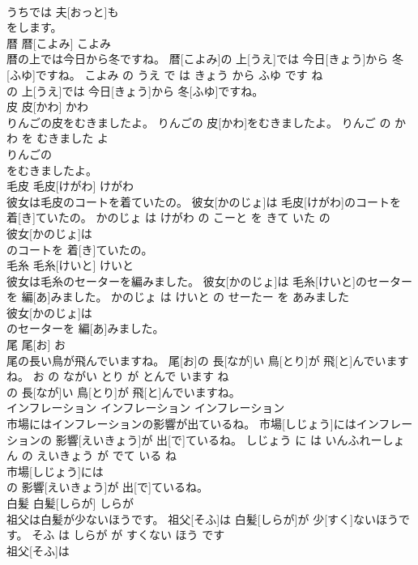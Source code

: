 \documentclass[8pt]{extreport}
\begin{document}
\begin{CJK}{UTF8}{min}
\\	うちでは 夫[おっと]も
\\	をします。			
\\	暦	暦[こよみ]	こよみ	
\\	暦の上では今日から冬ですね。	暦[こよみ]の 上[うえ]では 今日[きょう]から 冬[ふゆ]ですね。	こよみ の うえ で は きょう から ふゆ です ね	
\\	の 上[うえ]では 今日[きょう]から 冬[ふゆ]ですね。			
\\	皮	皮[かわ]	かわ	
\\	りんごの皮をむきましたよ。	りんごの 皮[かわ]をむきましたよ。	りんご の かわ を むきました よ	
\\	りんごの
\\	をむきましたよ。			
\\	毛皮	毛皮[けがわ]	けがわ	
\\	彼女は毛皮のコートを着ていたの。	彼女[かのじょ]は 毛皮[けがわ]のコートを 着[き]ていたの。	かのじょ は けがわ の こーと を きて いた の	
\\	彼女[かのじょ]は
\\	のコートを 着[き]ていたの。			
\\	毛糸	毛糸[けいと]	けいと	
\\	彼女は毛糸のセーターを編みました。	彼女[かのじょ]は 毛糸[けいと]のセーターを 編[あ]みました。	かのじょ は けいと の せーたー を あみました	
\\	彼女[かのじょ]は
\\	のセーターを 編[あ]みました。			
\\	尾	尾[お]	お	
\\	尾の長い鳥が飛んでいますね。	尾[お]の 長[なが]い 鳥[とり]が 飛[と]んでいますね。	お の ながい とり が とんで います ね	
\\	の 長[なが]い 鳥[とり]が 飛[と]んでいますね。			
\\	インフレーション	インフレーション	インフレーション	
\\	市場にはインフレーションの影響が出ているね。	市場[しじょう]にはインフレーションの 影響[えいきょう]が 出[で]ているね。	しじょう に は いんふれーしょん の えいきょう が でて いる ね	
\\	市場[しじょう]には
\\	の 影響[えいきょう]が 出[で]ているね。			
\\	白髪	白髪[しらが]	しらが	
\\	祖父は白髪が少ないほうです。	祖父[そふ]は 白髪[しらが]が 少[すく]ないほうです。	そふ は しらが が すくない ほう です	
\\	祖父[そふ]は

\end{CJK}
\end{document}
